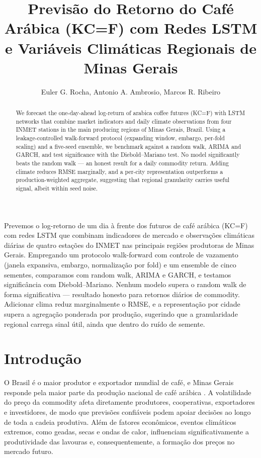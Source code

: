 \documentclass[12pt]{article}
\title{Previsão do Retorno do Café Arábica (KC=F) com Redes LSTM\\
e Variáveis Climáticas Regionais de Minas Gerais}
\author{Euler G. Rocha\inst{1}, Antonio A. Ambrosio\inst{1}, Marcos R. Ribeiro\inst{1}}
\begin{document}
\maketitle

\begin{abstract}
  We forecast the one-day-ahead log-return of arabica coffee futures (KC=F) with
  LSTM networks that combine market indicators and daily climate observations from
  four INMET stations in the main producing regions of Minas Gerais, Brazil.
  Using a leakage-controlled walk-forward protocol (expanding window, embargo,
  per-fold scaling) and a five-seed ensemble, we benchmark against a random walk,
  ARIMA and GARCH, and test significance with the Diebold--Mariano test. No model
  significantly beats the random walk --- an honest result for a daily commodity
  return. Adding climate reduces RMSE marginally, and a per-city representation
  outperforms a production-weighted aggregate, suggesting that regional
  granularity carries useful signal, albeit within seed noise.
\end{abstract}

\begin{resumo}
  Prevemos o log-retorno de um dia à frente dos futuros de café arábica (KC=F) com
  redes LSTM que combinam indicadores de mercado e observações climáticas diárias de
  quatro estações do INMET nas principais regiões produtoras de Minas Gerais.
  Empregando um protocolo walk-forward com controle de vazamento (janela expansiva,
  embargo, normalização por fold) e um ensemble de cinco sementes, comparamos com
  random walk, ARIMA e GARCH, e testamos significância com Diebold--Mariano. Nenhum
  modelo supera o random walk de forma significativa --- resultado honesto para
  retornos diários de commodity. Adicionar clima reduz marginalmente o RMSE, e a
  representação por cidade supera a agregação ponderada por produção, sugerindo que a
  granularidade regional carrega sinal útil, ainda que dentro do ruído de semente.
\end{resumo}

\section{Introdução}


O Brasil é o maior produtor e exportador mundial de café, e Minas Gerais responde
pela maior parte da produção nacional de café arábica \cite{CONAB2025}. A volatilidade do preço da
commodity afeta diretamente produtores, cooperativas, exportadores e investidores, de modo que
previsões confiáveis podem apoiar decisões ao longo de toda a cadeia produtiva. Além de fatores econômicos,
eventos climáticos extremos, como geadas, secas e ondas de calor, influenciam significativamente a produtividade das lavouras e, 
consequentemente, a formação dos preços no mercado futuro.
\end{document}
